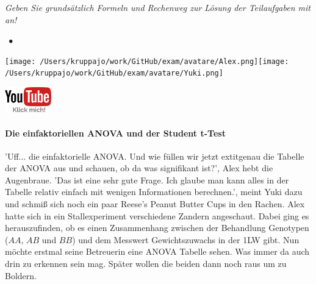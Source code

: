 \documentclass[a4paper, 9pt]{scrartcl}\usepackage[]{graphicx}\usepackage[]{xcolor}
\begin{document}
\textit{Geben Sie grundsätzlich Formeln und Rechenweg zur Lösung der Teilaufgaben mit an!} \\[1Ex]
 

 
\ifcollection
\begin{flushright}
\tiny\vspace{-3Ex}
\textbf{\examinhaltstart}
\exammodulestatversuch $\;\bullet$
\exammodulebiostat
\vspace{-4Ex}
\end{flushright}
\begin{minipage}[t]{0.5\textwidth}
\texttt{[image: /Users/kruppajo/work/GitHub/exam/avatare/Alex.png]}\hspace{-4mm}\texttt{[image: /Users/kruppajo/work/GitHub/exam/avatare/Yuki.png]}
\end{minipage}
\begin{minipage}[t]{0.5\textwidth}
\hfill
\href{https://youtu.be/49hvImMwVyE}{\includegraphics[width = 2cm]{img/youtube}}
\end{minipage}
\fi



\ifcollection
\paragraph{Die einfaktoriellen ANOVA und der Student t-Test}
\fi

'Uff... die einfaktorielle ANOVA. Und wie füllen wir jetzt 	extit{genau} die Tabelle der ANOVA aus und schauen, ob da was signifikant ist?', Alex hebt die Augenbraue. 'Das ist eine sehr gute Frage. Ich glaube man kann alles in der Tabelle relativ einfach mit wenigen Informationen berechnen.', meint Yuki dazu und schmiß sich noch ein paar Reese's Peanut Butter Cups in den Rachen. Alex hatte sich in ein Stallexperiment verschiedene Zandern angeschaut. Dabei ging es herauszufinden, ob es einen Zusammenhang zwischen der Behandlung Genotypen ($AA$, $AB$ und $BB$) und dem Messwert Gewichtszuwachs in der 1LW gibt. Nun möchte erstmal seine Betreuerin eine ANOVA Tabelle sehen. Was immer da auch drin zu erkennen sein mag. Später wollen die beiden dann noch raus um zu Boldern.
\end{document}
